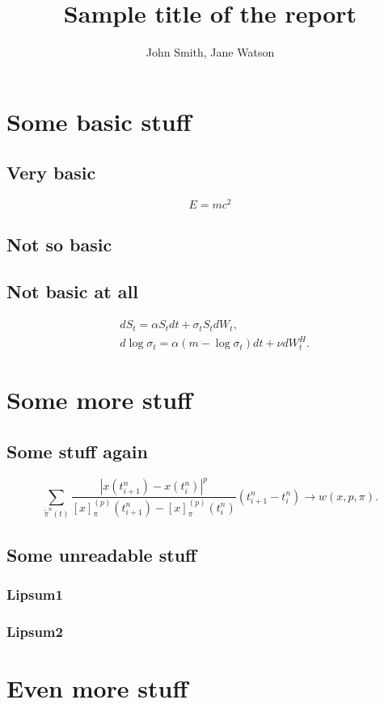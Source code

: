 \documentclass[
    ]{vegareport}
\title{Sample title of the report}
\author{John Smith, Jane Watson}
\date{}
\begin{document}
    \maketitle
    
    \introduction
        \lipsum[1-3]
        \cite{Black1976}

    \chapter{Some basic stuff}
        \section{Very basic}
            \lipsum[4]
            \begin{equation}
                E = mc^2
            \end{equation}
        \section{Not so basic}
            \lipsum[5-7]
        \section{Not basic at all}
            \begin{align}
                & dS_t          = \alpha S_t dt + \sigma_t S_tdW_t,               \label{model:RFSVasset} \\
                & d\log\sigma_t = \alpha (m - \log\sigma_t) dt + \nu dW_t^H.      \label{model:RFSVvol}
            \end{align}
            \lipsum*[2-4]

    \chapter{Some more stuff}
        \section{Some stuff again}
            \lipsum[8-11]
            \begin{equation}
                \sum_{\tilde\pi^n(t)}\frac{\left|x(t_{i+1}^n) - x(t_i^n)\right|^p}{\left[x\right]_{\pi}^{(p)}(t_{i+1}^n)-\left[x\right]_{\pi}^{(p)}(t_i^n)} (t_{i+1}^n-t_{i}^n) \to w(x, p, \pi).
            \end{equation}
        \section{Some unreadable stuff}
            \subsection{Lipsum1}
                \lipsum[12-13]
            \subsection{Lipsum2}
        

    \chapter{Even more stuff}
        \lipsum[17-25]

    \conclusion
        \lipsum[26-30]

\end{document}
